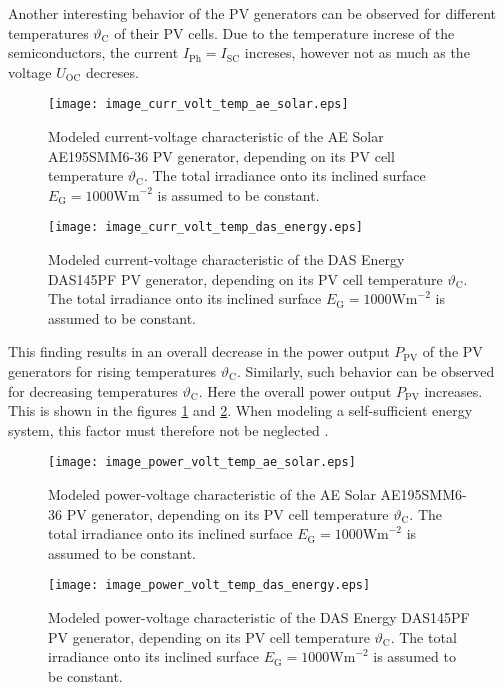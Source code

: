Another interesting behavior of the PV generators can be observed for different temperatures $\vartheta_\mathrm{C}$ of their PV cells. Due to the temperature increse of the semiconductors, the current $I_\mathrm{Ph} = I_\mathrm{SC}$ increses, however not as much as the voltage $U_\mathrm{OC}$ decreses. 
\begin{figure}[h!]
	\centering
  	\texttt{[image: image\_curr\_volt\_temp\_ae\_solar.eps]}
  	\caption{Modeled current-voltage characteristic of the AE Solar AE195SMM6-36 PV generator, depending on its PV cell temperature $\vartheta_\mathrm{C}$. The total irradiance onto its inclined surface $E_\mathrm{G} = 1000\mathrm{Wm}^{-2}$ is assumed to be constant.}
	\label{fig:image_curr_volt_temp_ae_solar}
\end{figure}
\begin{figure}[h!]
	\centering
  	\texttt{[image: image\_curr\_volt\_temp\_das\_energy.eps]}
  	\caption{Modeled current-voltage characteristic of the DAS Energy DAS145PF PV generator, depending on its PV cell temperature $\vartheta_\mathrm{C}$. The total irradiance onto its inclined surface $E_\mathrm{G} = 1000\mathrm{Wm}^{-2}$ is assumed to be constant.}
	\label{fig:image_curr_volt_temp_das_energy}
\end{figure}
This finding results in an overall decrease in the power output $P_\mathrm{PV}$ of the PV generators for rising temperatures $\vartheta_\mathrm{C}$. Similarly, such behavior can be observed for decreasing temperatures $\vartheta_\mathrm{C}$. Here the overall power output $P_\mathrm{PV}$ increases. This is shown in the figures \ref{fig:image_curr_volt_temp_ae_solar} and \ref{fig:image_curr_volt_temp_das_energy}. When modeling a self-sufficient energy system, this factor must therefore not be neglected \cite{Mertens:2015}. 
\begin{figure}[h!]
	\centering
  	\texttt{[image: image\_power\_volt\_temp\_ae\_solar.eps]}
  	\caption{Modeled power-voltage characteristic of the AE Solar AE195SMM6-36 PV generator, depending on its PV cell temperature $\vartheta_\mathrm{C}$. The total irradiance onto its inclined surface $E_\mathrm{G} = 1000\mathrm{Wm}^{-2}$ is assumed to be constant.}
	\label{fig:image_power_volt_temp_ae_solar}
\end{figure}
\begin{figure}[h!]
	\centering
  	\texttt{[image: image\_power\_volt\_temp\_das\_energy.eps]}
  	\caption{Modeled power-voltage characteristic of the DAS Energy DAS145PF PV generator, depending on its PV cell temperature $\vartheta_\mathrm{C}$. The total irradiance onto its inclined surface $E_\mathrm{G} = 1000\mathrm{Wm}^{-2}$ is assumed to be constant.}
	\label{fig:image_power_volt_temp_das_energy}
\end{figure}

